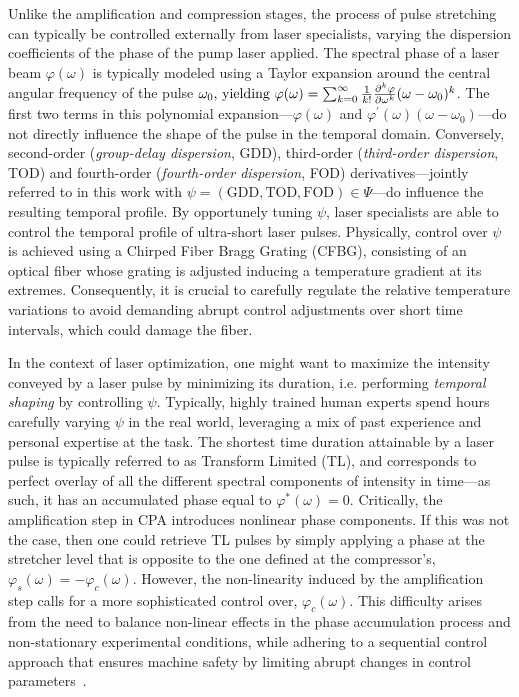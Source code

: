 Unlike the amplification and compression stages, the process of pulse stretching can typically be controlled externally from laser specialists, varying the dispersion coefficients of the phase of the pump laser applied. The spectral phase of a laser beam \( \varphi(\omega) \) is typically modeled using a Taylor expansion around the central angular frequency of the pulse \( \omega_0$, yielding $\varphi(\omega) = \sum_{k=0}^{\infty} \frac 1{k!}\frac{\partial^k \varphi}{\partial \omega^k} (\omega - \omega_0)^k \). The first two terms in this polynomial expansion---\( \varphi(\omega) \) and \( \varphi^\prime(\omega)(\omega - \omega_0) \)---do not directly influence the shape of the pulse in the temporal domain. Conversely, second-order (\textit{group-delay dispersion}, GDD), third-order (\textit{third-order dispersion}, TOD) and fourth-order (\textit{fourth-order dispersion}, FOD) derivatives---jointly referred to in this work with \( \psi = (\text{GDD}, \text{TOD}, \text{FOD}) \in \Psi \)---do influence the resulting temporal profile. 
By opportunely tuning \( \psi \), laser specialists are able to control the temporal profile of ultra-short laser pulses. Physically, control over $\psi$ is achieved using a Chirped Fiber Bragg Grating (CFBG), consisting of an optical fiber whose grating is adjusted inducing a temperature gradient at its extremes. Consequently, it is crucial to carefully regulate the relative temperature variations to avoid demanding abrupt control adjustments over short time intervals, which could damage the fiber.

In the context of laser optimization, one might want to maximize the intensity conveyed by a laser pulse by minimizing its duration, i.e. performing \textit{temporal shaping} by controlling \( \psi \). Typically, highly trained human experts spend hours carefully varying \( \psi \) in the real world, leveraging a mix of past experience and personal expertise at the task. The shortest time duration attainable by a laser pulse is typically referred to as Transform Limited (TL), and corresponds to perfect overlay of all the different spectral components of intensity in time---as such, it has an accumulated phase equal to \( \varphi^*(\omega)=0 \). Critically, the amplification step in CPA introduces nonlinear phase components. If this was not the case, then one could retrieve TL pulses by simply applying a phase at the stretcher level that is opposite to the one defined at the compressor's, \( \varphi_s(\omega) = - \varphi_c(\omega) \). However, the non-linearity induced by the amplification step calls for a more sophisticated control over, \( \varphi_c(\omega) \). This difficulty arises from the need to balance non-linear effects in the phase accumulation process and non-stationary experimental conditions, while adhering to a sequential control approach that ensures machine safety by limiting abrupt changes in control parameters~\citep{capuano2023temporl}.

